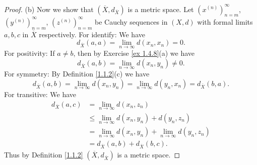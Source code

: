 \begin{proof}{(b)}
    Now we show that \((\overline{X}, d_{\overline{X}})\) is a metric space.
    Let \((x^{(n)})_{n = m}^\infty\), \((y^{(n)})_{n = m}^\infty\), \((z^{(n)})_{n = m}^\infty\) be Cauchy sequences in \((X, d)\) with formal limits \(a, b, c\) in \(\overline{X}\) respectively.
    For identify:
    We have
    \[
        d_{\overline{X}}(a, a) = \lim_{n \to \infty} d(x_n, x_n) = 0.
    \]
    For positivity:
    If \(a \neq b\), then by Exercise \ref{ex 1.4.8}(a) we have
    \[
        d_{\overline{X}}(a, b) = \lim_{n \to \infty} d(x_n, y_n) \neq 0.
    \]
    For symmetry:
    By Definition \ref{1.1.2}(c) we have
    \[
        d_{\overline{X}}(a, b) = \lim_{n \to \infty} d(x_n, y_n) = \lim_{n \to \infty} d(y_n, x_n) = d_{\overline{X}}(b, a).
    \]
    For transitive:
    We have
    \begin{align*}
        d_{\overline{X}}(a, c) & = \lim_{n \to \infty} d(x_n, z_n)                                   \\
                               & \leq \lim_{n \to \infty} d(x_n, y_n) + d(y_n, z_n)                  \\
                               & = \lim_{n \to \infty} d(x_n, y_n) + \lim_{n \to \infty} d(y_n, z_n) \\
                               & = d_{\overline{X}}(a, b) + d_{\overline{X}}(b, c).
    \end{align*}
    Thus by Definition \ref{1.1.2} \((\overline{X}, d_{\overline{X}})\) is a metric space.
\end{proof}

